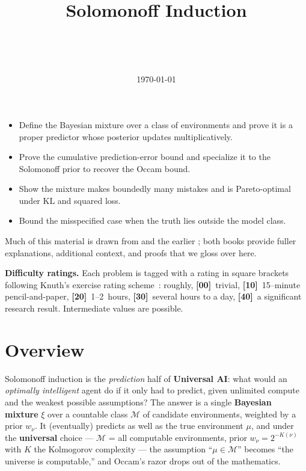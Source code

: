 \documentclass[fontsize=11pt, parskip=half]{scrartcl}
\begin{document}
\title{Solomonoff Induction}
\author{\\ 
  \and {}\\ }
\date{\today}
\maketitle

\begin{learningoutcomes}
  \begin{itemize}
    \item Define the Bayesian mixture over a class of environments and prove it is a proper predictor whose posterior updates multiplicatively.
    \item Prove the cumulative prediction-error bound and specialize it to the Solomonoff prior to recover the Occam bound.
    \item Show the mixture makes boundedly many mistakes and is Pareto-optimal under KL and squared loss.
    \item Bound the misspecified case when the truth lies outside the model class.
  \end{itemize}
\end{learningoutcomes}

\medskip
\noindent
Much of this material is drawn from \cite[Chapter 3]{Hutter:24uaibook2}
and the earlier \cite{Hutter:04uaibook}; both books provide fuller explanations, additional context, and proofs that we gloss over here.

\medskip
\noindent
\textbf{Difficulty ratings.} Each problem is tagged with a rating in square brackets following Knuth's exercise rating scheme~\cite{Knuth:73a}: roughly, \textbf{[00]}~trivial, \textbf{[10]}~15--minute pencil-and-paper, \textbf{[20]}~1--2~hours, \textbf{[30]}~several hours to a day, \textbf{[40]}~a significant research result. Intermediate values are possible.


\section*{Overview}

Solomonoff induction is the \emph{prediction} half of \textbf{Universal AI}: what
would an \emph{optimally intelligent} agent do if it only had to predict, given
unlimited compute and the weakest possible assumptions? The answer is a single
\textbf{Bayesian mixture} $\xi$ over a countable class $\mathcal{M}$ of candidate
environments, weighted by a prior $w_\nu$. It (eventually) predicts as well as the
true environment $\mu$, and under the \textbf{universal} choice --- $\mathcal{M}$ =
all computable environments, prior $w_\nu = 2^{-K(\nu)}$ with $K$ the Kolmogorov
complexity --- the assumption ``$\mu \in \mathcal{M}$'' becomes ``the universe is
computable,'' and Occam's razor drops out of the mathematics.
\end{document}
